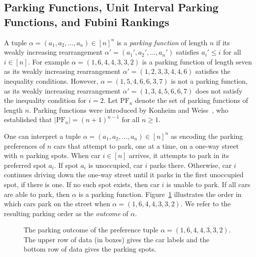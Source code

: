 \documentclass[11pt,reqno]{amsart}
\newcommand{\pf}[1]{\mathrm{PF}_{#1}}
\begin{document}
\subsection{Parking Functions, Unit Interval Parking Functions, and Fubini Rankings}

A tuple $\alpha=(a_1,a_2,\ldots,a_n)\in[n]^n$ is a \emph{parking function} of length $n$ if its weakly increasing rearrangement $\alpha'=(a_1',a_2',\ldots,a_n')$ satisfies $a_i'\leq i$ for all $i\in[n]$. 
For example $\alpha=(1,6,4,4,3,3,2)$ is a parking function of length seven as its weakly increasing rearrangement $\alpha'=(1,2,3,3,4,4,6)$ satisfies the inequality conditions.
However, $\alpha=(1,5,4,6,6,3,7)$ is not a parking function, as its weakly increasing rearrangement 
$\alpha'=(1,3,4,5,6,6,7)$ does not satisfy the inequality condition for $i=2$.
Let $\pf{n}$ denote the set of parking functions of length $n$.
Parking functions were introduced by Konheim and Weiss~\cite{konheim1966occupancy}, who established that $|\pf{n}|=(n+1)^{n-1}$ for all $n \geq 1$.

One can interpret a tuple $\alpha=(a_1,a_2,\ldots,a_n)\in[n]^n$ as encoding the parking preferences of $n$ cars that attempt to park, one at a time, on a one-way street with $n$ parking spots. 
When car $i \in [n]$ arrives, it attempts to park in its preferred spot $a_i$.
If spot $a_i$ is unoccupied, car $i$ parks there.
Otherwise, car $i$ continues driving down the one-way street until it parks in the first unoccupied spot, if there is one.
If no such spot exists, then car $i$ is unable to park.
If all cars are able to park, then $\alpha$ is a parking function.
Figure~\ref{fig: parking} illustrates the order in which cars park on the street when $\alpha=(1,6,4,4,3,3,2)$. 
We refer to the resulting parking order as the \emph{outcome} of $\alpha$. 

\begin{figure}[ht]
    \centering
    \caption{The parking outcome of the preference tuple $\alpha=(1,6,4,4,3,3,2)$.
The upper row of data (in boxes) gives the car labels and the bottom row of data gives the parking spots.}
    \label{fig: parking}
\end{figure}
\end{document}
